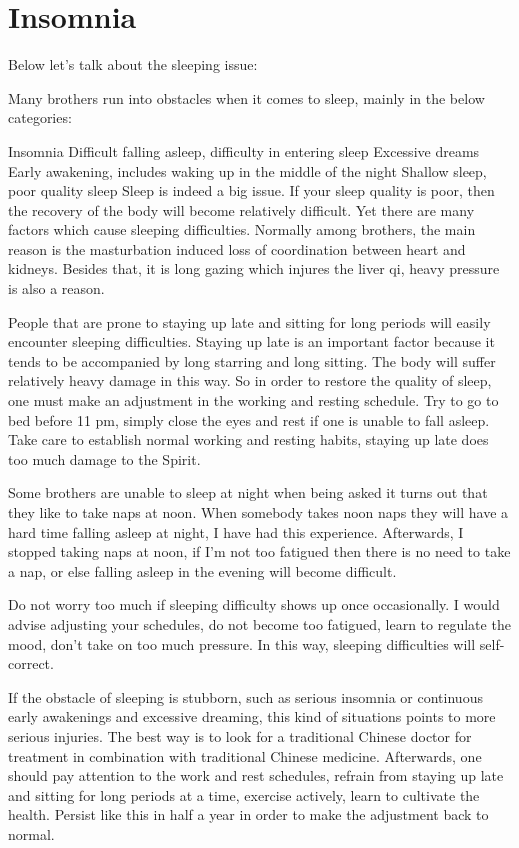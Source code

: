 \documentclass[
]{book}
\begin{document}
\hypertarget{insomnia}{%
\section{Insomnia}\label{insomnia}}

Below let's talk about the sleeping issue:

Many brothers run into obstacles when it comes to sleep, mainly in the below categories:

Insomnia
Difficult falling asleep, difficulty in entering sleep
Excessive dreams
Early awakening, includes waking up in the middle of the night
Shallow sleep, poor quality sleep
Sleep is indeed a big issue. If your sleep quality is poor, then the recovery of the body will become relatively difficult. Yet there are many factors which cause sleeping difficulties. Normally among brothers, the main reason is the masturbation induced loss of coordination between heart and kidneys. Besides that, it is long gazing which injures the liver qi, heavy pressure is also a reason.

People that are prone to staying up late and sitting for long periods will easily encounter sleeping difficulties. Staying up late is an important factor because it tends to be accompanied by long starring and long sitting. The body will suffer relatively heavy damage in this way. So in order to restore the quality of sleep, one must make an adjustment in the working and resting schedule. Try to go to bed before 11 pm, simply close the eyes and rest if one is unable to fall asleep. Take care to establish normal working and resting habits, staying up late does too much damage to the Spirit.

Some brothers are unable to sleep at night when being asked it turns out that they like to take naps at noon. When somebody takes noon naps they will have a hard time falling asleep at night, I have had this experience. Afterwards, I stopped taking naps at noon, if I'm not too fatigued then there is no need to take a nap, or else falling asleep in the evening will become difficult.

Do not worry too much if sleeping difficulty shows up once occasionally. I would advise adjusting your schedules, do not become too fatigued, learn to regulate the mood, don't take on too much pressure. In this way, sleeping difficulties will self-correct.

If the obstacle of sleeping is stubborn, such as serious insomnia or continuous early awakenings and excessive dreaming, this kind of situations points to more serious injuries. The best way is to look for a traditional Chinese doctor for treatment in combination with traditional Chinese medicine. Afterwards, one should pay attention to the work and rest schedules, refrain from staying up late and sitting for long periods at a time, exercise actively, learn to cultivate the health. Persist like this in half a year in order to make the adjustment back to normal.
\end{document}
